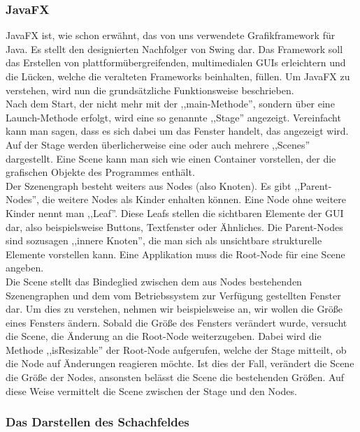 \documentclass[12pt,a4paper]{article}
\begin{document}
\subsubsection{JavaFX}
\label{SUBSUBSEC:JAVAFX}
JavaFX ist, wie schon erwähnt, das von uns verwendete Grafikframework für Java. Es stellt den designierten Nachfolger von Swing dar. Das Framework soll das Erstellen von plattformübergreifenden, multimedialen GUIs erleichtern und die Lücken, welche die veralteten Frameworks beinhalten, füllen.
Um JavaFX zu verstehen, wird nun die grundsätzliche Funktionsweise beschrieben.\\ [2ex]
Nach dem Start, der nicht mehr mit der ,,main-Methode'', sondern über eine Launch-Methode erfolgt, wird eine so genannte ,,Stage'' angezeigt. Vereinfacht kann man sagen, dass es sich dabei um das Fenster handelt, das angezeigt wird.\\
Auf der Stage werden überlicherweise eine oder auch mehrere ,,Scenes'' dargestellt. Eine Scene kann man sich wie einen Container vorstellen, der die grafischen Objekte des Programmes enthält. \\
Der Szenengraph besteht weiters aus Nodes (also Knoten). Es gibt ,,Parent-Nodes'', die weitere Nodes als Kinder enhalten können. Eine Node ohne weitere Kinder nennt man ,,Leaf''. Diese Leafs stellen die sichtbaren Elemente der GUI dar, also beispielsweise Buttons, Textfenster oder Ähnliches. Die Parent-Nodes sind sozusagen ,,innere Knoten'', die man sich als unsichtbare strukturelle Elemente vorstellen kann. Eine Applikation muss die Root-Node für eine Scene angeben. \\
Die Scene stellt das Bindeglied zwischen dem aus Nodes bestehenden Szenengraphen und dem vom Betriebssystem zur Verfügung gestellten Fenster dar. Um dies zu verstehen, nehmen wir beispielsweise an, wir wollen die Größe eines Fensters ändern. Sobald die Größe des Fensters verändert wurde, versucht die Scene, die Änderung an die Root-Node weiterzugeben. Dabei wird die Methode ,,isResizable'' der Root-Node aufgerufen, welche der Stage mitteilt, ob die Node auf Änderungen reagieren möchte. Ist dies der Fall, verändert die Scene die Größe der Nodes, ansonsten belässt die Scene die bestehenden Größen. Auf diese Weise vermittelt die Scene zwischen der Stage und den Nodes. 

\subsubsection{Das Darstellen des Schachfeldes}
\label{SUBSUBSEC:BOARDGUI}
\end{document}
